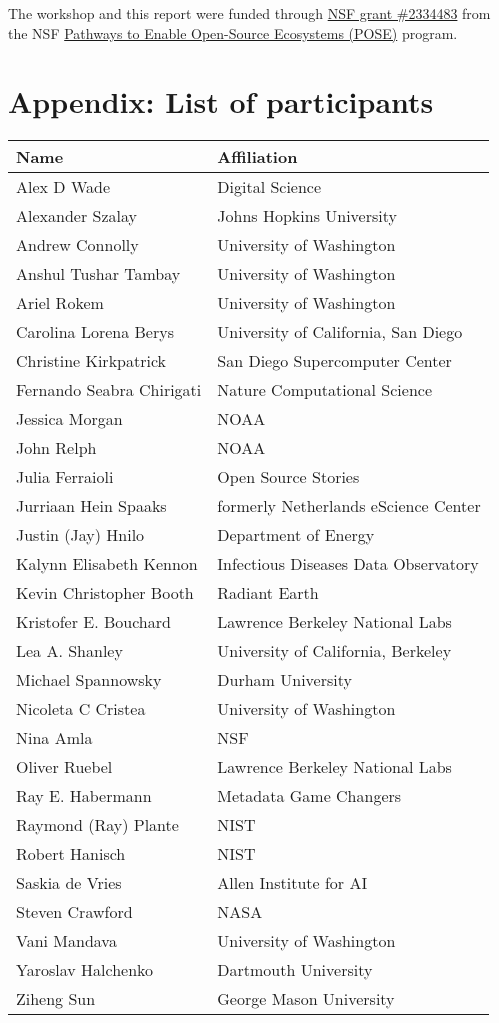 \documentclass[
  letterpaper,
  DIV=11,
  numbers=noendperiod]{scrartcl}
\begin{document}
The workshop and this report were funded through
\href{https://www.nsf.gov/awardsearch/showAward?AWD_ID=2334483&HistoricalAwards=false}{NSF
grant \#2334483} from the NSF
\href{https://new.nsf.gov/funding/opportunities/pathways-enable-open-source-ecosystems-pose}{Pathways
to Enable Open-Source Ecosystems (POSE)} program.

\section{Appendix: List of
participants}\label{appendix-list-of-participants}

\begin{longtable}[]{@{}ll@{}}
\toprule\noalign{}
Name & Affiliation \\
\midrule\noalign{}
\endhead
\bottomrule\noalign{}
\endlastfoot
Alex D Wade & Digital Science \\
Alexander Szalay & Johns Hopkins University \\
Andrew Connolly & University of Washington \\
Anshul Tushar Tambay & University of Washington \\
Ariel Rokem & University of Washington \\
Carolina Lorena Berys & University of California, San Diego \\
Christine Kirkpatrick & San Diego Supercomputer Center \\
Fernando Seabra Chirigati & Nature Computational Science \\
Jessica Morgan & NOAA \\
John Relph & NOAA \\
Julia Ferraioli & Open Source Stories \\
Jurriaan Hein Spaaks & formerly Netherlands eScience Center \\
Justin (Jay) Hnilo & Department of Energy \\
Kalynn Elisabeth Kennon & Infectious Diseases Data Observatory \\
Kevin Christopher Booth & Radiant Earth \\
Kristofer E. Bouchard & Lawrence Berkeley National Labs \\
Lea A. Shanley & University of California, Berkeley \\
Michael Spannowsky & Durham University \\
Nicoleta C Cristea & University of Washington \\
Nina Amla & NSF \\
Oliver Ruebel & Lawrence Berkeley National Labs \\
Ray E. Habermann & Metadata Game Changers \\
Raymond (Ray) Plante & NIST \\
Robert Hanisch & NIST \\
Saskia de Vries & Allen Institute for AI \\
Steven Crawford & NASA \\
Vani Mandava & University of Washington \\
Yaroslav Halchenko & Dartmouth University \\
Ziheng Sun & George Mason University \\
\end{longtable}
\end{document}
